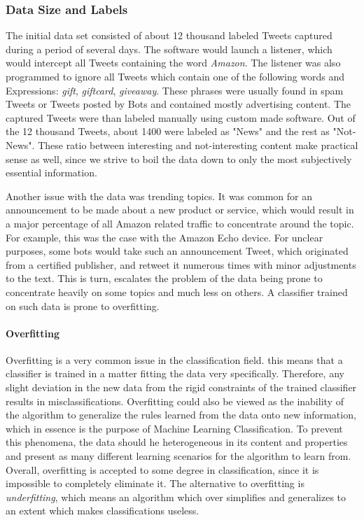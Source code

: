 		\subsubsection{Data Size and Labels}
			The initial data set consisted of about 12 thousand labeled Tweets captured during a period of several days. The software would launch a listener, which would intercept all Tweets containing the word \textit{Amazon}. The listener was also programmed to ignore all Tweets which contain one of the following words and Expressions: \textit{gift}, \textit{giftcard}, \textit{giveaway}. These phrases were usually found in spam Tweets or Tweets posted by Bots and contained mostly advertising content. The captured Tweets were than labeled manually using custom made software. Out of the 12 thousand Tweets, about 1400 were labeled as "News" and the rest as "Not-News". These ratio between interesting and not-interesting content make practical sense as well, since we strive to boil the data down to only the most subjectively essential information. 
			
			\par
			
			Another issue with the data was trending topics. It was common for an announcement to be made about a new product or service, which would result in a major percentage of all Amazon related traffic to concentrate around the topic. For example, this was the case with the Amazon Echo device. For unclear purposes, some bots would take such an announcement Tweet, which originated from a certified publisher, and retweet it numerous times with minor adjustments to the text. This is turn, escalates the problem of the data being prone to concentrate heavily on some topics and much less on others. A classifier trained on such data is prone to overfitting.
			
			\paragraph{Overfitting}
				Overfitting is a very common issue in the classification field. this means that a classifier is trained in a matter fitting the data very specifically. Therefore, any slight deviation in the new data from the rigid constraints of the trained classifier results in misclassifications. Overfitting could also be viewed as the inability of the algorithm to generalize the rules learned from the data onto new information, which in essence is the purpose of Machine Learning Classification. To prevent this phenomena, the data should he heterogeneous in its content and properties and present as many different learning scenarios for the algorithm to learn from. Overall, overfitting is accepted to some degree in classification, since it is impossible to completely eliminate it. The alternative to overfitting is \textit{underfitting}, which means an algorithm which over simplifies and generalizes to an extent which makes classifications useless.
		
